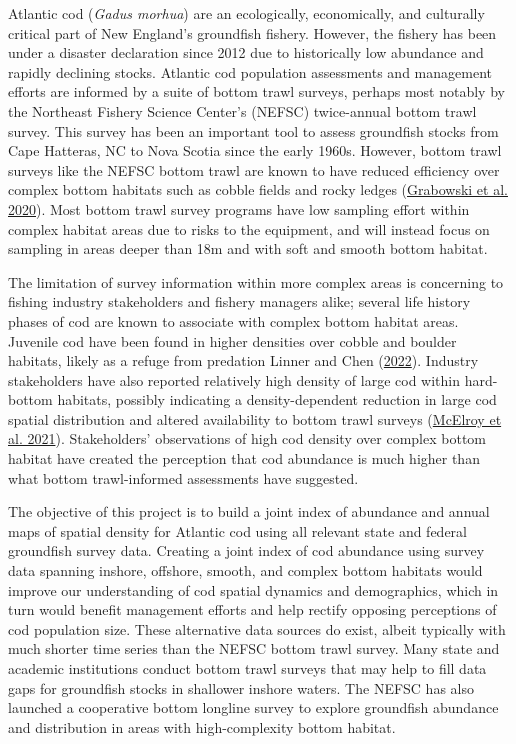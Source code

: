 \documentclass[
]{article}
\begin{document}
Atlantic cod (\emph{Gadus morhua}) are an ecologically, economically, and culturally critical part of New England's groundfish fishery. However, the fishery has been under a disaster declaration since 2012 due to historically low abundance and rapidly declining stocks. Atlantic cod population assessments and management efforts are informed by a suite of bottom trawl surveys, perhaps most notably by the Northeast Fishery Science Center's (NEFSC) twice-annual bottom trawl survey. This survey has been an important tool to assess groundfish stocks from Cape Hatteras, NC to Nova Scotia since the early 1960s. However, bottom trawl surveys like the NEFSC bottom trawl are known to have reduced efficiency over complex bottom habitats such as cobble fields and rocky ledges (\protect\hyperlink{ref-grabowski_2020}{Grabowski et al. 2020}). Most bottom trawl survey programs have low sampling effort within complex habitat areas due to risks to the equipment, and will instead focus on sampling in areas deeper than 18m and with soft and smooth bottom habitat.

The limitation of survey information within more complex areas is concerning to fishing industry stakeholders and fishery managers alike; several life history phases of cod are known to associate with complex bottom habitat areas. Juvenile cod have been found in higher densities over cobble and boulder habitats, likely as a refuge from predation Linner and Chen (\protect\hyperlink{ref-linner_2022}{2022}). Industry stakeholders have also reported relatively high density of large cod within hard-bottom habitats, possibly indicating a density-dependent reduction in large cod spatial distribution and altered availability to bottom trawl surveys (\protect\hyperlink{ref-mcelroy_2021}{McElroy et al. 2021}). Stakeholders' observations of high cod density over complex bottom habitat have created the perception that cod abundance is much higher than what bottom trawl-informed assessments have suggested.

The objective of this project is to build a joint index of abundance and annual maps of spatial density for Atlantic cod using all relevant state and federal groundfish survey data. Creating a joint index of cod abundance using survey data spanning inshore, offshore, smooth, and complex bottom habitats would improve our understanding of cod spatial dynamics and demographics, which in turn would benefit management efforts and help rectify opposing perceptions of cod population size. These alternative data sources do exist, albeit typically with much shorter time series than the NEFSC bottom trawl survey. Many state and academic institutions conduct bottom trawl surveys that may help to fill data gaps for groundfish stocks in shallower inshore waters. The NEFSC has also launched a cooperative bottom longline survey to explore groundfish abundance and distribution in areas with high-complexity bottom habitat.
\end{document}
